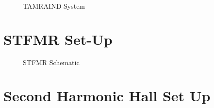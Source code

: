 \begin{figure}
    \caption{
        TAMRAIND System
    }
\end{figure}
\section{STFMR Set-Up}

\begin{figure}
    \caption{
        STFMR Schematic
    }
\end{figure}

\section{Second Harmonic Hall Set Up}
